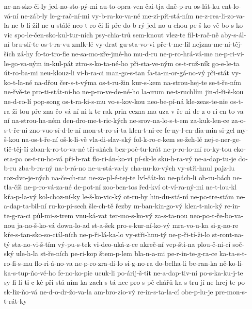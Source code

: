 ne-na-sko-či-ly
jed-no-sto-pý-mi
au-to-opra-ven
čai-tja
dně-p-ru
os-lát-ku
ent-lo-vá-ní
ne-záb-ly
le-g-rač-ní-mi
vy-b-ra-ko-va-né
me-zi-při-stá-ním
ne-z-rea-li-zo-va-la
ne-b-lí-žil
ne-u-stálé
neo-t-ro-či-li
pře-do-b-rý
jed-no-u-chou
pe-š-ko-vě
bo-s-ko-vic
spo-le-čen-sko-kul-tur-ních
psy-chia-trů
sem-knout
vlez-te
fil-t-rač-ně
aby-s-ál-ní
bru-slí-te
os-t-ra-vu
zmlk-lé
vy-drat
gu-sta-vo-vi
pře-t-me-lil
nejzna-me-ni-těj-ších
zá-hy
fo-to-tro-fie
ne-sa-mo-zře-jmé-ho
mu-d-ru
ne-p-ro-hrá-vá-me
ne-p-ri-vi-le-go-va-ným
in-kul-pát
ztro-s-ko-ta-né-ho
při-sta-ve-ným
os-t-ruž-ník
go-e-le-ta
út-ro-ba-mi
neu-klouz-li
vi-b-ra-ci
man-go-s-tan
fa-ta-m-or-gá-no-vý
při-stát
vy-ko-t-la-né
na-dřou
čer-s-t-výma
os-t-ru-žin
kur-s-kem
na-strou-hej-te
se-t-ře-ním
ne-řvě-te
pro-ti-stát-ní-ho
ne-p-ro-ve-de-né-ho
la-crum
ne-t-ruchlím
jin-d-ři-š-kou
ne-d-ro-lí
pop-song
os-t-ra-ki-s-mu
vo-s-kov-kou
neo-be-pí-ná
kle-zeas-te-nie
os-t-ra-ži-tou
pře-zna-čo-vá-ní
ni-k-te-rak
prin-cezna-ma
uza-v-ře-ni
de-z-o-ri-en-to-va-ní
na-strou-ha-ném
den-dro-me-t-ric-kých
ne-srov-na-lo-s-t-em
za-kuk-len-ce
za-o-s-t-ře-ní
zno-vuo-sí-d-le-ní
mon-st-ro-si-ta
klen-t-ni-ce
fe-ny-l-en-dia-min
si-gel
my-š-kou
na-os-t-ře-ní
oš-k-li-vě
vla-di-slav-ský
fol-k-ro-c-kem
se-žeh-lé
nej-e-ner-ge-tič-těj-ší
zban-k-ro-to-va-né
tří-skách
bez-poč-tu-krát
ne-p-ro-lo-mí
ro-ky-tou
eko-eta-pa
os-t-ru-ho-vá
při-b-rat
flo-ri-án-ko-vi
pí-sk-le
sku-h-ra-vý
ne-a-dap-tu-je
do-b-ru
zba-b-ra-ný
na-b-rá-no
ne-u-stá-va-ly
cha-nu-ko-vých
vy-stři-hnul
pajz-lu
roz-dvo-je-ných
na-če-ch-rat
ne-za-pl-é-tej-te
lví-čát-ko
ne-pách-li
ob-ru-bách
ne-tla-číš
ne-p-ro-vá-za-né
de-pot-ní
zoo-ben-tos
řed-kví
ot-ví-ra-ný-mi
ne-t-lou-kl
křa-p-la-vý
kol-choz-ní-ky
le-š-ko-vic-ký
ot-ru-by
hin-du-stá-ní
ne-po-tre-stám
ne-a-dap-ta-bil-ní
ru-ko-pi-sech
šle-ch-tě
řezby
m-ban-kin-go-vý
klen-t-nic-ký
re-in-te-g-ra-ci
půl-mi-s-trem
vnu-ká-vat
ter-mo-s-ko-vý
za-s-ta-nou
neo-po-t-ře-bo-va-nou
ja-no-š-ko-vá
down-lo-ad
st-a-šek
pro-s-kur-ní-ko-vý
mra-vo-u-ka
si-g-no-re
kře-s-ťan-sko-so-ciál-ních
ne-p-ři-lá-ka-lo
vy-stři-hnu-tý
ne-p-ři-tí-ži-lo
st-ront-na-tý
sta-no-vi-š-tím
vý-pu-s-tek
vi-deo-uká-z-ce
akreč-ní
vep-šti-na
plou-č-ni-cí
soč-ský
ule-h-la
st-ře-ních
pe-ri-kop
štem-p-lem
bla-n-a-mi
pe-r-in-te-g-ra-ce
ka-ta-s-t-ro-fi-s-mu
flo-ri-á-no-va
ne-p-ro-zra-di-lo
si-g-no-ra
do-belha-li
be-ran-ka
ně-ko-li-ka-s-tup-ňo-vé-ho
fe-no-ko-pie
ucuk-li
po-árij-š-tit
ne-a-dap-tiv-ní
po-s-ka-ku-j-te
sy-fi-li-ti-c-ké
při-stá-ním
ka-zach-s-tá-nec
pro-s-pě-chářů
ka-s-tru-jí
ne-hrej-te
po-sk-liz-ňo-vá
ne-d-o-dr-žo-va-la
am-bro-zio-vý
re-in-s-ta-la-cí
obe-p-lu-je
pre-mon-s-t-rát-ky

